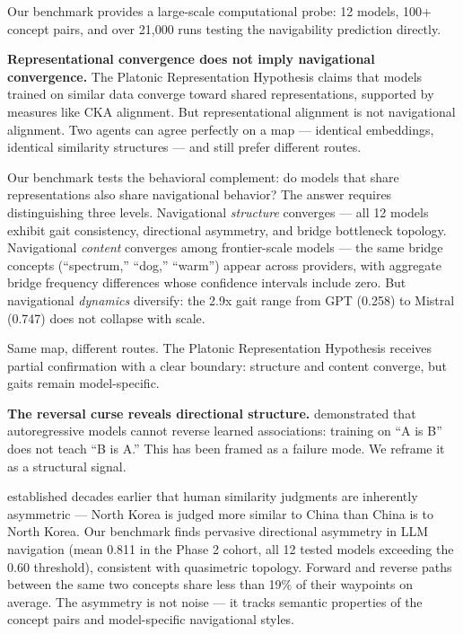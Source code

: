 Our benchmark provides a large-scale computational probe: 12 models, 100+ concept pairs, and over 21,000 runs testing the navigability prediction directly.

\textbf{Representational convergence does not imply navigational convergence.} The Platonic Representation Hypothesis \citep{huh2024platonic} claims that models trained on similar data converge toward shared representations, supported by measures like CKA alignment. But representational alignment is not navigational alignment. Two agents can agree perfectly on a map --- identical embeddings, identical similarity structures --- and still prefer different routes.

Our benchmark tests the behavioral complement: do models that share representations also share navigational behavior? The answer requires distinguishing three levels. Navigational \emph{structure} converges --- all 12 models exhibit gait consistency, directional asymmetry, and bridge bottleneck topology. Navigational \emph{content} converges among frontier-scale models --- the same bridge concepts (``spectrum,'' ``dog,'' ``warm'') appear across providers, with aggregate bridge frequency differences whose confidence intervals include zero. But navigational \emph{dynamics} diversify: the 2.9x gait range from GPT (0.258) to Mistral (0.747) does not collapse with scale.

Same map, different routes. The Platonic Representation Hypothesis receives partial confirmation with a clear boundary: structure and content converge, but gaits remain model-specific.

\textbf{The reversal curse reveals directional structure.} \citet{berglund2024reversal} demonstrated that autoregressive models cannot reverse learned associations: training on ``A is B'' does not teach ``B is A.'' This has been framed as a failure mode. We reframe it as a structural signal.

\citet{tversky1977features} established decades earlier that human similarity judgments are inherently asymmetric --- North Korea is judged more similar to China than China is to North Korea. Our benchmark finds pervasive directional asymmetry in LLM navigation (mean 0.811 in the Phase 2 cohort, all 12 tested models exceeding the 0.60 threshold), consistent with quasimetric topology. Forward and reverse paths between the same two concepts share less than 19\% of their waypoints on average. The asymmetry is not noise --- it tracks semantic properties of the concept pairs and model-specific navigational styles.

